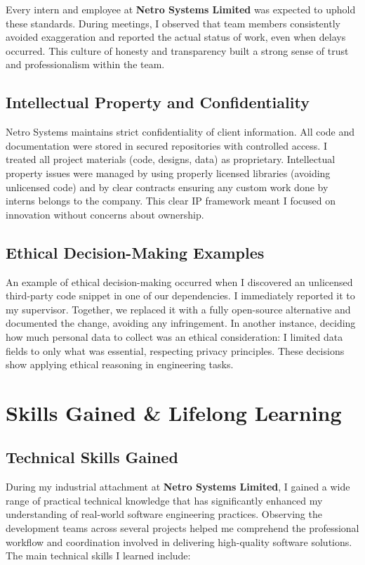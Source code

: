 \documentclass[12pt,a4paper]{report}
\newcommand{\company}[1]{\textcolor{companycolor}{\textbf{#1}}}
\let\oldcite\cite
\renewcommand{\cite}[1]{\textcolor{impactcolor}{\oldcite{#1}}}
\begin{document}
Every intern and employee at \company{Netro Systems Limited} was expected to uphold these standards. During meetings, I observed that team members consistently avoided exaggeration and reported the actual status of work, even when delays occurred. This culture of honesty and transparency built a strong sense of trust and professionalism within the team.


\section{Intellectual Property and Confidentiality}
Netro Systems maintains strict confidentiality of client information. All code and documentation were stored in secured repositories with controlled access. I treated all project materials (code, designs, data) as proprietary. Intellectual property issues were managed by using properly licensed libraries (avoiding unlicensed code) and by clear contracts ensuring any custom work done by interns belongs to the company. This clear IP framework meant I focused on innovation without concerns about ownership.

\section{Ethical Decision-Making Examples}
An example of ethical decision-making occurred when I discovered an unlicensed third-party code snippet in one of our dependencies. I immediately reported it to my supervisor. Together, we replaced it with a fully open-source alternative and documented the change, avoiding any infringement. In another instance, deciding how much personal data to collect was an ethical consideration: I limited data fields to only what was essential, respecting privacy principles. These decisions show applying ethical reasoning in engineering tasks.

\chapter{Skills Gained \& Lifelong Learning}

\section{Technical Skills Gained}
During my industrial attachment at \company{Netro Systems Limited}, I gained a wide range of practical technical knowledge that has significantly enhanced my understanding of real-world software engineering \cite{ref11} practices. Observing the development teams across several projects helped me comprehend the professional workflow and coordination involved in delivering high-quality software solutions. The main technical skills I learned include:
\end{document}
